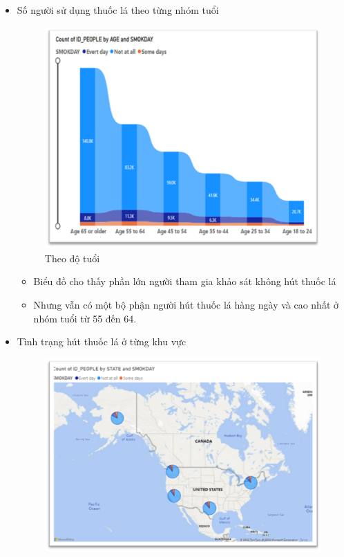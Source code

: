 \begin{itemize}[label=$-$]
\item Số người sử dụng thuốc lá theo từng nhóm tuổi
\begin{center}
            \begin{figure}[!h]
                \centering
                \includegraphics[scale = 0.9]{figures/Hoa/DE3.1.png} 
              \caption{Theo độ tuổi }
            \end{figure}
\end{center}
\begin{itemize}[label=$+$]
\item Biểu đồ cho thấy phần lớn người tham gia khảo sát không hút thuốc lá
\item Nhưng vẫn có một bộ phận người hút thuốc lá hàng ngày và cao nhất ở nhóm tuổi từ 55 đến 64.
\end{itemize}\newpage
\item Tình trạng hút thuốc lá ở từng khu vực 
\begin{center}
            \begin{figure}[!h]
                \centering
                \includegraphics[scale = 0.9]{figures/Hoa/DE3.2.png} 

\end{figure}
\end{center}
\end{itemize}
